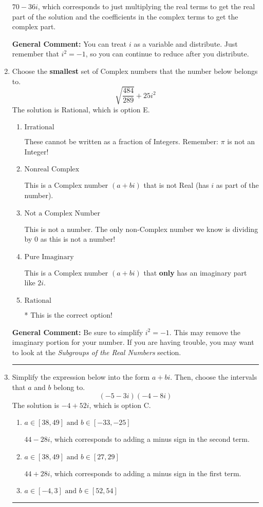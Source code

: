 \documentclass{extbook}[14pt]
\newcommand{\litem}[1]{\item #1

\rule{\textwidth}{0.4pt}}
\begin{document}
\begin{enumerate}
{\begin{enumerate}[label=\Alph*.]
 $70 - 36 i$, which corresponds to just multiplying the real terms to get the real part of the solution and the coefficients in the complex terms to get the complex part.
\end{enumerate}

\textbf{General Comment:} You can treat $i$ as a variable and distribute. Just remember that $i^2=-1$, so you can continue to reduce after you distribute.
}
\litem{
Choose the \textbf{smallest} set of Complex numbers that the number below belongs to.
\[ \sqrt{\frac{484}{289}} + 25i^2 \]The solution is \( \text{Rational} \), which is option E.\begin{enumerate}[label=\Alph*.]
\item \( \text{Irrational} \)

These cannot be written as a fraction of Integers. Remember: $\pi$ is not an Integer!
\item \( \text{Nonreal Complex} \)

This is a Complex number $(a+bi)$ that is not Real (has $i$ as part of the number).
\item \( \text{Not a Complex Number} \)

This is not a number. The only non-Complex number we know is dividing by 0 as this is not a number!
\item \( \text{Pure Imaginary} \)

This is a Complex number $(a+bi)$ that \textbf{only} has an imaginary part like $2i$.
\item \( \text{Rational} \)

* This is the correct option!
\end{enumerate}

\textbf{General Comment:} Be sure to simplify $i^2 = -1$. This may remove the imaginary portion for your number. If you are having trouble, you may want to look at the \textit{Subgroups of the Real Numbers} section.
}
\litem{
Simplify the expression below into the form $a+bi$. Then, choose the intervals that $a$ and $b$ belong to.
\[ (-5 - 3 i)(-4 - 8 i) \]The solution is \( -4 + 52 i \), which is option C.\begin{enumerate}[label=\Alph*.]
\item \( a \in [38, 49] \text{ and } b \in [-33, -25] \)

 $44 - 28 i$, which corresponds to adding a minus sign in the second term.
\item \( a \in [38, 49] \text{ and } b \in [27, 29] \)

 $44 + 28 i$, which corresponds to adding a minus sign in the first term.
\item \( a \in [-4, 3] \text{ and } b \in [52, 54] \)


\end{enumerate}}
\end{enumerate}
\end{document}
